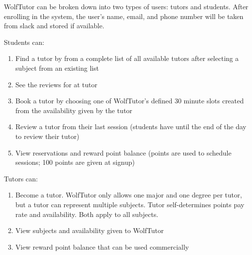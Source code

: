 WolfTutor can be broken down into two types of users: tutors and students.
After enrolling in the system, the user's name, email, and phone number will be taken from slack and stored if available.

Students can:
\begin{enumerate}
  \item Find a tutor by from a complete list of all available tutors after selecting a subject from an existing list
  \item See the reviews for at tutor
  \item Book a tutor by choosing one of WolfTutor's defined 30 minute slots created from the availability given by the tutor
  \item Review a tutor from their last session (students have until the end of the day to review their tutor)
  \item View reservations and reward point balance (points are used to schedule sessions; 100 points are given at signup)
\end{enumerate}

Tutors can:
\begin{enumerate}
  \item Become a tutor. WolfTutor only allows one major and one degree per tutor, but a tutor can represent multiple subjects. Tutor self-determines points pay rate and availability. Both apply to all subjects.
  \item View subjects and availability given to WolfTutor
  \item View reward point balance that can be used commercially
\end{enumerate}
